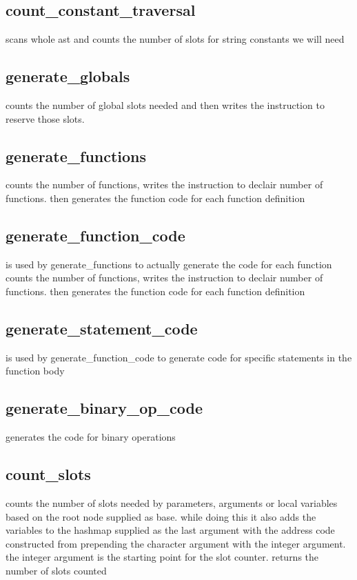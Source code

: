 \documentclass[11pt]{article}
\begin{document}
        \subsection{count\_constant\_traversal}
            scans whole ast and counts the number of slots
            for string constants we will need

        \subsection{generate\_globals}
            counts the number of global slots needed and then writes the 
            instruction to reserve those slots.

        \subsection{generate\_functions}
            counts the number of functions, writes the instruction to declair number
            of functions. then generates the function code for each function definition

        \subsection{generate\_function\_code}
            is used by generate\_functions to actually generate the code for each function
            counts the number of functions, writes the instruction to declair number
            of functions. then generates the function code for each function definition

        \subsection{generate\_statement\_code}
            is used by generate\_function\_code to generate code for specific statements 
            in the function body

        \subsection{generate\_binary\_op\_code}
            generates the code for binary operations

        \subsection{count\_slots}
            counts the number of slots needed by parameters, arguments or 
            local variables based on the root node supplied as base.
            while doing this it also adds the variables to the hashmap supplied
            as the last argument with the address code constructed from
            prepending the character argument with the integer argument.
            the integer argument is the starting point for the slot counter.
            returns the number of slots counted
\end{document}
